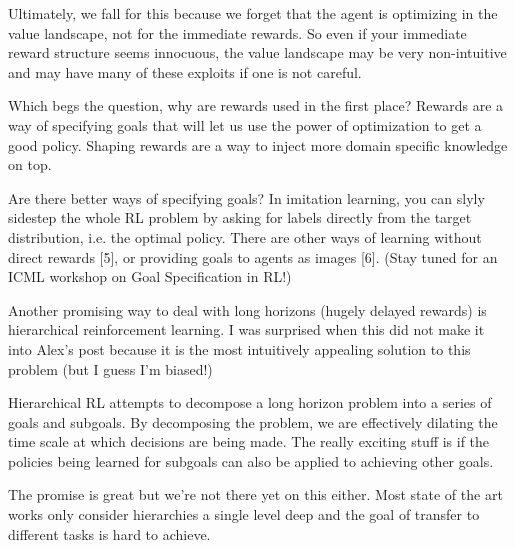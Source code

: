 Ultimately, we fall for this because we forget that the agent is optimizing in the value landscape, not for the immediate rewards. So even if your immediate reward structure seems innocuous, the value landscape may be very non-intuitive and may have many of these exploits if one is not careful.

Which begs the question, why are rewards used in the first place? Rewards are a way of specifying goals that will let us use the power of optimization to get a good policy. Shaping rewards are a way to inject more domain specific knowledge on top.

Are there better ways of specifying goals? In imitation learning, you can slyly sidestep the whole RL problem by asking for labels directly from the target distribution, i.e. the optimal policy. There are other ways of learning without direct rewards [5], or providing goals to agents as images [6]. (Stay tuned for an ICML workshop on Goal Specification in RL!)

Another promising way to deal with long horizons (hugely delayed rewards) is hierarchical reinforcement learning. I was surprised when this did not make it into Alex’s post because it is the most intuitively appealing solution to this problem (but I guess I’m biased!)

Hierarchical RL attempts to decompose a long horizon problem into a series of goals and subgoals. By decomposing the problem, we are effectively dilating the time scale at which decisions are being made. The really exciting stuff is if the policies being learned for subgoals can also be applied to achieving other goals.

The promise is great but we’re not there yet on this either. Most state of the art works only consider hierarchies a single level deep and the goal of transfer to different tasks is hard to achieve.